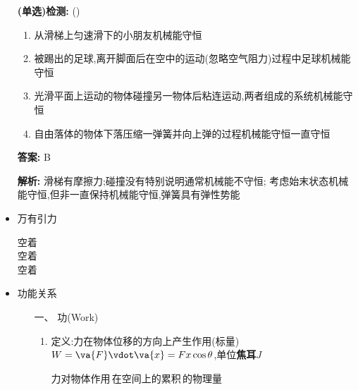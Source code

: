\documentclass{article}
\begin{document}
\begin{itemize}
          \vspace{1em}

    \item[] \textbf{(单选)检测:} (\qquad)

        \begin{enumerate}[label=\Alph*.]
            \item 从滑梯上匀速滑下的小朋友机械能守恒
            \item 被踢出的足球,离开脚面后在空中的运动(忽略空气阻力)过程中足球机械能守恒
            \item 光滑平面上运动的物体碰撞另一物体后粘连运动,两者组成的系统机械能守恒
            \item 自由落体的物体下落压缩一弹簧并向上弹的过程机械能守恒一直守恒
        \end{enumerate}

        \textbf{答案:} B

        \textbf{解析:} 滑梯有摩擦力;碰撞没有特别说明通常机械能不守恒;
        考虑始末状态机械能守恒,但非一直保持机械能守恒,弹簧具有弹性势能

        \hspace{2em}

    \item 万有引力

          空着    \\
          空着    \\
          空着    \\

          \hspace{2em}

    \item 功能关系
          \begin{enumerate}
              \item[一、] 功(Work)
                  \begin{enumerate}
                      \item 定义:力在物体位移的方向上产生作用(标量)$ W = \va{F} \vdot \va{x} = Fx\cos{\theta}$,单位\textbf{焦耳$J$}

                            \vspace{-1em}

                            \hspace{-1em}\begin{adjustbox}{minipage=0.37\linewidth, bgcolor=gray!20, padding=1em}
                                \small %
                                力对物体作用\,在空间上的累积\,的物理量
                            \end{adjustbox}


\end{enumerate}
\end{enumerate}
\end{itemize}
\end{document}
